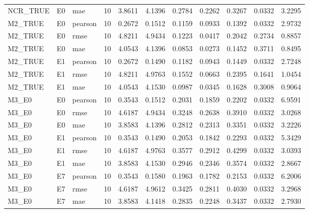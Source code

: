 \begin{tabular}{lllrrrrrrrr}
NCR_TRUE & E0 & mae & 10 & 3.8611 & 4.1396 & 0.2784 & 0.2262 & 0.3267 & 0.0332 & 3.2295 \\
M2_TRUE & E0 & pearson & 10 & 0.2672 & 0.1512 & 0.1159 & 0.0933 & 0.1392 & 0.0332 & 2.9732 \\
M2_TRUE & E0 & rmse & 10 & 4.8211 & 4.9434 & 0.1223 & 0.0417 & 0.2042 & 0.2734 & 0.8857 \\
M2_TRUE & E0 & mae & 10 & 4.0543 & 4.1396 & 0.0853 & 0.0273 & 0.1452 & 0.3711 & 0.8495 \\
M2_TRUE & E1 & pearson & 10 & 0.2672 & 0.1490 & 0.1182 & 0.0943 & 0.1449 & 0.0332 & 2.7248 \\
M2_TRUE & E1 & rmse & 10 & 4.8211 & 4.9763 & 0.1552 & 0.0663 & 0.2395 & 0.1641 & 1.0454 \\
M2_TRUE & E1 & mae & 10 & 4.0543 & 4.1530 & 0.0987 & 0.0345 & 0.1628 & 0.3008 & 0.9064 \\
M3_E0 & E0 & pearson & 10 & 0.3543 & 0.1512 & 0.2031 & 0.1859 & 0.2202 & 0.0332 & 6.9591 \\
M3_E0 & E0 & rmse & 10 & 4.6187 & 4.9434 & 0.3248 & 0.2638 & 0.3910 & 0.0332 & 3.0268 \\
M3_E0 & E0 & mae & 10 & 3.8583 & 4.1396 & 0.2812 & 0.2313 & 0.3351 & 0.0332 & 3.2226 \\
M3_E0 & E1 & pearson & 10 & 0.3543 & 0.1490 & 0.2053 & 0.1842 & 0.2293 & 0.0332 & 5.3429 \\
M3_E0 & E1 & rmse & 10 & 4.6187 & 4.9763 & 0.3577 & 0.2912 & 0.4299 & 0.0332 & 3.0393 \\
M3_E0 & E1 & mae & 10 & 3.8583 & 4.1530 & 0.2946 & 0.2346 & 0.3574 & 0.0332 & 2.8667 \\
M3_E0 & E7 & pearson & 10 & 0.3543 & 0.1580 & 0.1963 & 0.1782 & 0.2153 & 0.0332 & 6.2006 \\
M3_E0 & E7 & rmse & 10 & 4.6187 & 4.9612 & 0.3425 & 0.2811 & 0.4030 & 0.0332 & 3.2968 \\
M3_E0 & E7 & mae & 10 & 3.8583 & 4.1418 & 0.2835 & 0.2248 & 0.3437 & 0.0332 & 2.7930 \\
\bottomrule
\end{tabular}

